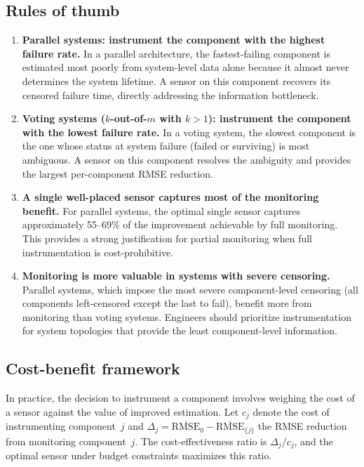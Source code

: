 \documentclass[12pt]{article}
\theoremstyle{definition}
\theoremstyle{remark}
\begin{document}
\subsection{Rules of thumb}
\label{sec:rules}

\begin{enumerate}
  \item \textbf{Parallel systems: instrument the component with the
    highest failure rate.}
    In a parallel architecture, the fastest-failing component is
    estimated most poorly from system-level data alone because it
    almost never determines the system lifetime.  A sensor on this
    component recovers its censored failure time, directly addressing
    the information bottleneck.

  \item \textbf{Voting systems ($k$-out-of-$m$ with $k > 1$):
    instrument the component with the lowest failure rate.}
    In a voting system, the slowest component is the one whose status
    at system failure (failed or surviving) is most ambiguous.  A
    sensor on this component resolves the ambiguity and provides the
    largest per-component RMSE reduction.

  \item \textbf{A single well-placed sensor captures most of the
    monitoring benefit.}
    For parallel systems, the optimal single sensor captures
    approximately 55--69\% of the improvement achievable by full
    monitoring.  This provides a strong justification for partial
    monitoring when full instrumentation is cost-prohibitive.

  \item \textbf{Monitoring is more valuable in systems with severe
    censoring.}
    Parallel systems, which impose the most severe component-level
    censoring (all components left-censored except the last to fail),
    benefit more from monitoring than voting systems.  Engineers
    should prioritize instrumentation for system topologies that
    provide the least component-level information.
\end{enumerate}

\subsection{Cost-benefit framework}
\label{sec:cost-benefit}

In practice, the decision to instrument a component involves weighing
the cost of a sensor against the value of improved estimation.  Let
$c_j$ denote the cost of instrumenting component~$j$ and
$\Delta_j = \overline{\mathrm{RMSE}}_0 - \overline{\mathrm{RMSE}}_{\{j\}}$
the RMSE reduction from monitoring component~$j$.  The
cost-effectiveness ratio is $\Delta_j / c_j$, and the optimal sensor
under budget constraints maximizes this ratio.
\end{document}
